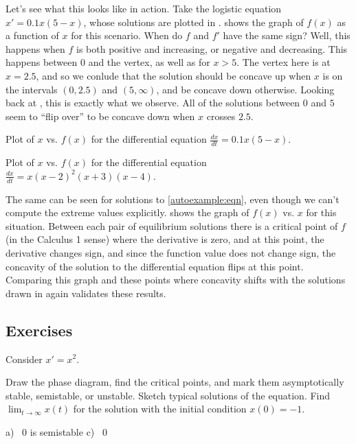 Let's see what this looks like in action. Take the logistic equation $x' = 0.1x(5-x)$, whose solutions are plotted in .  shows the graph of $f(x)$ as a function of $x$ for this scenario. When do $f$ and $f'$ have the same sign? Well, this happens when $f$ is both positive and increasing, or negative and decreasing. This happens between $0$ and the vertex, as well as for $x> 5$. The vertex here is at $x=2.5$, and so we conlude that the solution should be concave up when $x$ is on the intervals $(0, 2.5)$ and $(5, \infty)$, and be concave down otherwise. Looking back at , this is exactly what we observe. All of the solutions between $0$ and $5$ seem to ``flip over'' to be concave down when $x$ crosses $2.5$.   

\begin{myfig}
\parbox[t]{3.0in}{
 \capstart
 \caption{Plot of $x$ vs. $f(x)$ for the differential equation $\frac{dx}{dt} = 0.1x(5-x)$.\label{autologfplot:fig}}
}
\quad
\parbox[t]{3.0in}{
 \capstart
 \caption{{Plot of $x$ vs. $f(x)$ for the differential equation $\frac{dx}{dt} = x(x-2)^2(x+3)(x-4)$.\label{autoexfplot:fig}}
} }
\end{myfig}

The same can be seen for solutions to \eqref{autoexample:eqn}, even though we can't compute the extreme values explicitly.  shows the graph of $f(x)$ vs. $x$ for this situation. Between each pair of equilibrium solutions there is a critical point of $f$ (in the Calculus 1 sense) where the derivative is zero, and at this point, the derivative changes sign, and since the function value does not change sign, the concavity of the solution to the differential equation flips at this point. Comparing this graph and these points where concavity shifts with the solutions drawn in  again validates these results.


\subsection{Exercises}

\begin{samepage}
\begin{exercise}
Consider $x' = x^2$.
\begin{tasks}
\task Draw the phase diagram,
find the critical points, and mark them asymptotically stable, semistable, or unstable.
\task Sketch typical solutions of the equation.
\task Find $\displaystyle \lim_{t\to \infty} x(t)$ for the solution with the initial condition
$x(0) = -1$.
\end{tasks}
\end{exercise}
\end{samepage}
\comboSol{%
}
{%
a)~ 0 is semistable \quad c)~ 0
}



